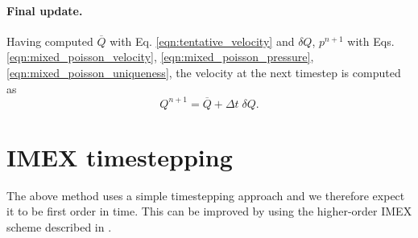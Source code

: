 \documentclass[11pt]{article}
\begin{document}
\paragraph{Final update.}
Having computed $\overline{Q}$ with Eq. \eqref{eqn:tentative_velocity} and $\delta Q$, $p^{n+1}$ with Eqs. \eqref{eqn:mixed_poisson_velocity}, \eqref{eqn:mixed_poisson_pressure}, \eqref{eqn:mixed_poisson_uniqueness}, the velocity at the next timestep is computed as
\begin{equation}
    Q^{n+1} = \overline{Q} + \Delta t\; \delta Q.
\end{equation}
\section{IMEX timestepping}\label{sec:imex}
The above method uses a simple timestepping approach and we therefore expect it to be first order in time. This can be improved by using the higher-order IMEX \cite{Ascher1997} scheme described in \cite[Section 4]{Ueckermann2016}.
\end{document}
